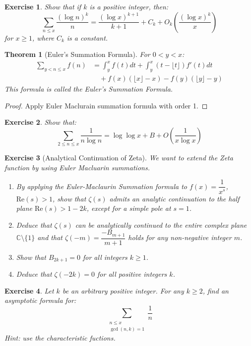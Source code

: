\documentclass{article}
\newtheorem{thm}{Theorem}
\newtheorem{ex}{Exercise}
\begin{document}
\begin{ex}
    Show that if $k$ is a positive integer, then:
    $$
    \sum_{n \le x} \frac{(\log n)^k}{n} = \frac{(\log x)^{k+1}}{k+1} + C_k + O_k\left(\frac{(\log x)^k}{x}\right)
    $$
    for $x \ge 1$, where $C_k$ is a constant.

\end{ex}

\begin{thm}[Euler's Summation Formula] For $0 < y < x$:
    \begin{align*}
    \sum_{y < n \le x} f(n) &= \int_{y}^{x} f(t) dt + \int_{y}^{x} (t - \lfloor t \rfloor) f'(t) dt \\
    &\quad + f(x)(\lfloor x \rfloor - x) - f(y)(\lfloor y \rfloor - y)
    \end{align*}
    This formula is called the Euler's Summation Formula.
\end{thm}

\begin{proof}
	Apply Euler Maclurain summation formula with order 1.
\end{proof}

\begin{ex}
Show that:
$$
    \sum_{2 \le n \le x} \frac{1}{n \log n} = \log \log x + B + O\left(\frac{1}{x \log x}\right)
$$
\end{ex}

\begin{ex}[Analytical Continuation of Zeta]
	We want to extend the Zeta function by using Euler Macluarin summations.
	\begin{enumerate}[label=(\alph*)]
        \item By applying the Euler-Maclaurin Summation formula to $f(x) = \dfrac{1}{x^s}$, $\text{Re}(s) > 1$, show that $\zeta(s)$ admits an analytic continuation to the half plane $\text{Re}(s) > 1-2k$, except for a simple pole at $s=1$.
        \item Deduce that $\zeta(s)$ can be analytically continued to the entire complex plane $\mathbb{C} \setminus \{1\}$ and that $\zeta(-m) = \dfrac{-B_{m+1}}{m+1}$ holds for any non-negative integer $m$.
        \item Show that $B_{2k+1} = 0$ for all integers $k \ge 1$.
        \item Deduce that $\zeta(-2k) = 0$ for all positive integers $k$.
	\end{enumerate}
\end{ex}

\begin{ex}
    Let $k$ be an arbitrary positive integer. For any $k \ge 2$, find an asymptotic formula for:
    $$
    \sum_{\substack{n \le x \\ \gcd(n, k) = 1}} \frac{1}{n}
    $$
    \textit{Hint:} use the characteristic fuctions.
\end{ex}
\end{document}
